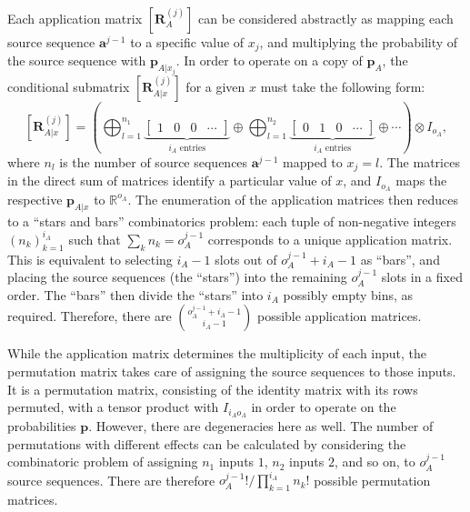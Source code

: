 \documentclass[10pt, a4paper]{article}
\numberwithin{equation}{section} %
\theoremstyle{definition}
\theoremstyle{plain}
\newcommand{\?}{\mathrel{?}} %
\newcommand{\R}{\mathbb{R}} %
\newcommand{\cvec}[1]{\boldsymbol{\mathbf{#1}}}    %
\newcommand{\matr}[2][]{\left[\mathbf{#2}#1\right]} %
\begin{document}
              Each application matrix \(\matr[_{A}^{(j)}]{R}\) can be considered abstractly as mapping each source sequence \(\cvec{a}^{j-1}\) to a specific value of \(x_j\), and multiplying the probability of the source sequence with \(\cvec{p}_{A|x_j}\). In order to operate on a copy of \(\cvec{p}_A\), the conditional submatrix \(\matr[_{A|x}^{(j)}]{R}\) for a given \(x\) must take the following form:
              \begin{equation}
                \matr[_{A|x}^{(j)}]{R} = \left( \bigoplus_{l=1}^{n_1} \underbrace{\begin{bmatrix} 1 & 0 & 0 & \cdots \end{bmatrix}}_{i_A\text{ entries}}
                  \oplus \bigoplus_{l=1}^{n_2} \underbrace{\begin{bmatrix} 0 & 1 & 0 & \cdots \end{bmatrix}}_{i_A\text{ entries}} \oplus \cdots
                \right) \otimes I_{o_A},
                \end{equation}
                where \(n_l\) is the number of source sequences \(\cvec{a}^{j-1}\) mapped to \(x_j = l\). The matrices in the direct sum of matrices identify a particular value of \(x\), and \(I_{o_A}\) maps the respective \(\cvec{p}_{A|x}\) to \(\R^{o_A}\). The enumeration of the application matrices then reduces to a ``stars and bars'' combinatorics problem: each tuple of non-negative integers \({(n_k)}_{k=1}^{i_A}\) such that \( \sum_{k} n_k = o_A^{j-1} \) corresponds to a unique application matrix. This is equivalent to selecting \(i_A-1\) slots out of \(o_A^{j-1}+i_A-1\) as ``bars'', and placing the source sequences (the ``stars'') into the remaining \(o_A^{j-1}\) slots in a fixed order. The ``bars'' then divide the ``stars'' into \(i_A\) possibly empty bins, as required. Therefore, there are \(\binom{o_A^{j-1} + i_A-1}{i_A-1}\) possible application matrices.

                While the application matrix determines the multiplicity of each input, the permutation matrix takes care of assigning the source sequences to those inputs. It is a permutation matrix, consisting of the identity matrix with its rows permuted, with a tensor product with \(I_{i_A o_A}\) in order to operate on the probabilities \(\cvec{p}\). However, there are degeneracies here as well. The number of permutations with different effects can be calculated by considering the combinatoric problem of assigning \(n_1\) inputs \(1\), \(n_2\) inputs \(2\), and so on, to \(o_A^{j-1}\) source sequences. There are therefore \(o_A^{j-1}!/\prod_{k=1}^{i_A} n_k!\) possible permutation matrices.
\end{document}
